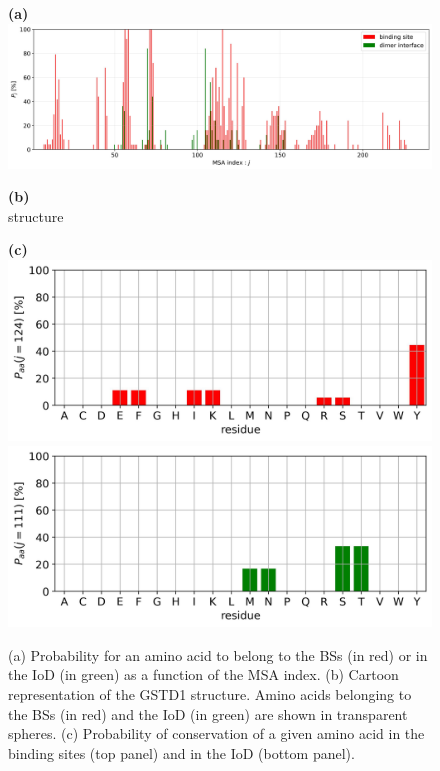 \begin{figure}[H]
	\label{BS & DI Proba}
	\begin{minipage}{.99\textwidth}
		\textbf{(a)}\\
		\includegraphics[width=\textwidth]{figures/MSA_Proba.jpg} %
	\end{minipage}
	\begin{minipage}{.49\linewidth}
		\textbf{(b)}\\
		structure 
	\end{minipage}	
	\begin{minipage}{.48\linewidth}
		\textbf{(c)}\\
		\includegraphics[width=\textwidth]{figures/amino-acid_conservation_BS_j=124.jpg}
		\includegraphics[width=\textwidth]{figures/amino-acid_conservation_DI_j=111.jpg}
	\end{minipage}	
	\caption{(a) Probability for an amino acid to belong to the BSs (in red) or in the IoD (in green) as a function of the MSA index. (b) Cartoon representation of the GSTD1 structure. Amino acids belonging  to the BSs (in red) and the IoD (in green) are shown in transparent spheres. (c) Probability of conservation of a given amino acid in the binding sites (top panel) and in the IoD (bottom panel).}
\end{figure}

